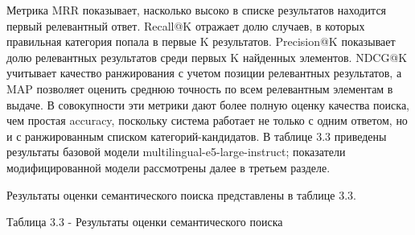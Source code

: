 \documentclass[14pt,a4paper]{extarticle}
\renewcommand{\textbf}[1]{#1}
\numberwithin{figure}{section}
\numberwithin{table}{section}
\begin{document}
Метрика MRR показывает, насколько высоко в списке результатов находится
первый релевантный ответ. Recall@K отражает долю случаев, в которых
правильная категория попала в первые K результатов. Precision@K
показывает долю релевантных результатов среди первых K найденных
элементов. NDCG@K учитывает качество ранжирования с учетом позиции
релевантных результатов, а MAP позволяет оценить среднюю точность по
всем релевантным элементам в выдаче. В совокупности эти метрики дают
более полную оценку качества поиска, чем простая accuracy, поскольку
система работает не только с одним ответом, но и с ранжированным списком
категорий-кандидатов. В таблице 3.3 приведены результаты базовой модели multilingual-e5-large-instruct; показатели модифицированной модели рассмотрены далее в третьем разделе.

Результаты оценки семантического поиска представлены в таблице 3.3.

\textbf{Таблица 3.3 - Результаты оценки семантического поиска}
\end{document}
